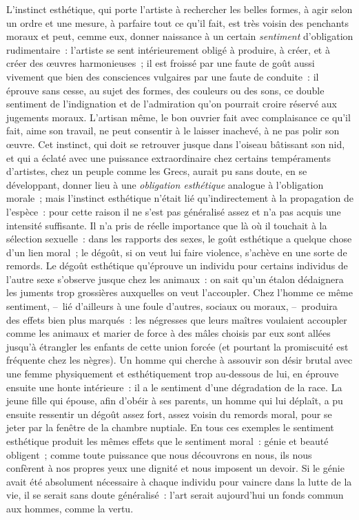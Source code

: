 \documentclass[french,twoside]{book} %
\begin{document}
L’instinct esthétique, qui porte l’artiste à rechercher les belles formes, à agir selon un ordre et une mesure, à parfaire tout ce qu’il fait, est très voisin des penchants moraux et peut, cemme eux, donner naissance à un certain \emph{sentiment} d’obligation rudimentaire : l’artiste se sent intérieurement obligé à produire, à créer, et à créer des œuvres harmonieuses ; il est froissé par une faute de goût aussi vivement que bien des consciences vulgaires par une faute de conduite : il éprouve sans cesse, au sujet des formes, des couleurs ou des sons, ce double sentiment de l’indignation et de l’admiration qu’on pourrait croire réservé aux jugements moraux. L’artisan même, le bon ouvrier fait avec complaisance ce qu’il fait, aime son travail, ne peut consentir à le laisser inachevé, à ne pas polir son œuvre. Cet instinct, qui doit se retrouver jusque dans l’oiseau bâtissant son nid, et qui a éclaté avec une puissance extraordinaire chez certains tempéraments d’artistes, chez un peuple comme les Grecs, aurait pu sans doute, en se développant, donner lieu à une \emph{obligation esthétique} analogue à l’obligation morale ; mais l’instinct esthétique n’était lié qu’indirectement à la propagation de l’espèce : pour cette raison il ne s’est pas généralisé assez et n’a pas acquis une intensité suffisante. Il n’a pris de réelle importance que là où il touchait à la sélection sexuelle : dans les rapports des sexes, le goût esthétique a quelque chose d’un lien moral ; le dégoût, si on veut lui faire violence, s’achève en une sorte de remords. Le dégoût esthétique qu’éprouve un individu pour certains individus de l’autre sexe s’observe jusque chez les animaux : on sait qu’un étalon dédaignera les juments trop grossières auxquelles on veut l’accoupler. Chez l’homme ce même sentiment, – lié d’ailleurs à une foule d’autres, sociaux ou moraux, – produira des effets bien plus marqués : les négresses que leurs maîtres voulaient accoupler comme les animaux et marier de force à des mâles choisis par eux sont allées jusqu’à étrangler les enfants de cette union forcée (et pourtant la promiscuité est fréquente chez les nègres). Un homme qui cherche à assouvir son désir brutal avec une femme physiquement et esthétiquement trop au-dessous de lui, en éprouve ensuite une honte intérieure : il a le sentiment d’une dégradation de la race. La jeune fille qui épouse, afin d’obéir à ses parents, un homme qui lui déplaît, a pu ensuite ressentir un dégoût assez fort, assez voisin du remords moral, pour se jeter par la fenêtre de la chambre nuptiale. En tous ces exemples le sentiment esthétique produit les mêmes effets que le sentiment moral : génie et beauté obligent ; comme toute puissance que nous découvrons en nous, ils nous confèrent à nos propres yeux une dignité et nous imposent un devoir. Si le génie avait été absolument nécessaire à chaque individu pour vaincre dans la lutte de la vie, il se serait sans doute généralisé : l’art serait aujourd’hui un fonds commun aux hommes, comme la vertu.\par
\end{document}
